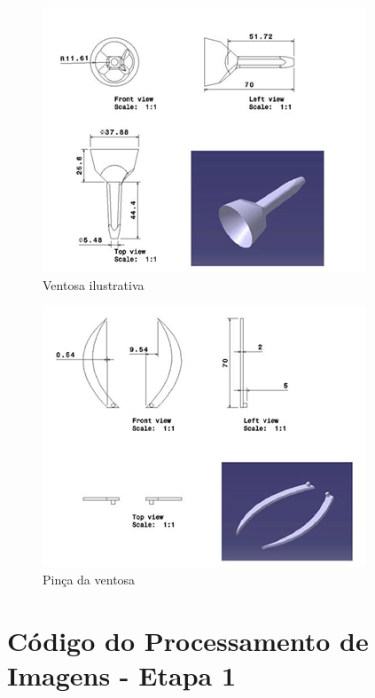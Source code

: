 \begin{apendicesenv}
\begin{figure}[H]
    \centering
      \includegraphics[scale=1.0]{figuras/tec14.png}
    \caption{Ventosa ilustrativa}
    \label{tec14}
\end{figure}

\begin{figure}[H]
    \centering
      \includegraphics[scale=1.0]{figuras/tec15.png}
    \caption{Pinça da ventosa}
    \label{tec15}
\end{figure}

\chapter{Código do Processamento de Imagens - Etapa 1}


\end{apendicesenv}
